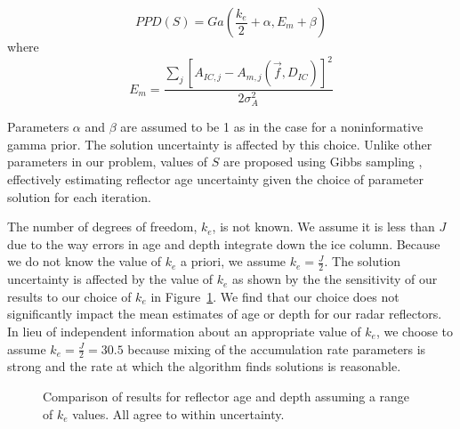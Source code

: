 \begin{equation}\label{eqn:S}
PPD(S) = Ga(\frac{k_e}{2}+\alpha, E_m+\beta)
\end{equation}
where 
\begin{equation}
 E_m= \frac{\sum_{j}[A_{IC,j} - A_{m,j}(\vec{f},D_{IC})]^2}{2\sigma_A^2} 
\end{equation}

Parameters $\alpha$ and $\beta$ are assumed to be 1 as in the case for a noninformative gamma prior. The solution uncertainty is affected by this choice. Unlike other parameters in our problem, values of $S$ are proposed using Gibbs sampling \citep{gelfand1992}, effectively estimating reflector age uncertainty given the choice of parameter solution for each iteration.

The number of degrees of freedom, $k_e$, is not known. We assume it is less than $J$ due to the way errors in age and depth integrate down the ice column. Because we do not know the value of $k_e$ a priori, we assume $k_e = \frac{J}{2}$. The solution uncertainty is affected by the value of $k_e$ as shown by the the sensitivity of our results to our choice of $k_e$ in Figure~\ref{fig:ke}. We find that our choice does not significantly impact the mean estimates of age or depth for our radar reflectors. In lieu of independent information about an appropriate value of $k_e$, we choose to assume $k_e = \frac{J}{2} = 30.5$ because mixing of the accumulation rate parameters is strong and the rate at which the algorithm finds solutions is reasonable. 

\begin{figure}[ht]
\begin{center}
{}
\caption[scale=0.3]{Comparison of results for reflector age and depth assuming a range of $k_e$ values. All agree to within uncertainty.}
\end{center}
\label{fig:ke}
\end{figure}


